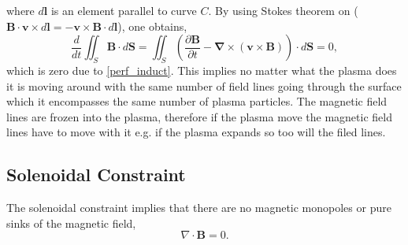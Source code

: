 \documentclass[12pt]{ociamthesis}
\newcommand{\bs}[1]{\boldsymbol{#1}}
\newcommand{\bn}{\boldsymbol{\nabla}}
\begin{document}
where $d\bs{l}$ is an element parallel to curve $C$. By using Stokes theorem on ($\bs{B} \cdot \bs{v} \times d\bs{l} = - \bs{v} \times \bs{B} \cdot d \bs{l}$), one obtains,
\begin{equation}
    \frac{d}{dt} \iint_S \bs{B} \cdot d \bs{S} = \iint_S \left( \frac{\partial \boldsymbol{B}}{\partial t} - \bn \times (\boldsymbol{v} \times \boldsymbol{B})  \right) \cdot d\bs{S} = 0, 
\end{equation}
which is zero due to \eqref{perf_induct}. This implies no matter what the plasma does it is moving around with the same number of field lines going through the surface which it encompasses the same number of plasma particles. The magnetic field lines are frozen into the plasma, therefore if the plasma move the magnetic field lines have to move with it e.g. if the plasma expands so too will the filed lines.
\subsection{Solenoidal Constraint}
\label{section:cont_eq}
The solenoidal constraint implies that there are no magnetic monopoles or pure sinks of the magnetic field,
\begin{equation}\label{eq90}
\nabla \cdot \boldsymbol{B} = 0.
\end{equation}
\end{document}
